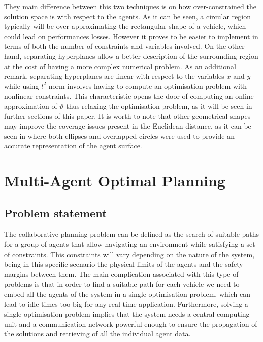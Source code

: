 \documentclass[a4paper,fleqn]{cas-sc}
\begin{document}
    They main difference between this two techniques is on how over-constrained the solution space is with respect to the agents. As it can be seen, a circular region typically will be over-approximating the rectangular shape of a vehicle, which could lead on performances losses. However it proves to be easier to implement in terms of both the number of constraints and variables involved. On the other hand, separating hyperplanes allow a better description of the surrounding region at the cost of having a more complex numerical problem. As an additional remark, separating hyperplanes are linear with respect to the variables $x$ and $y$ while using $l^2$ norm involves having to compute an optimisation problem with nonlinear constraints. This characteristic opens the door of computing an online approximation of $\vartheta$ thus relaxing the optimisation problem, as it will be seen in further sections of this paper. It is worth to note that other geometrical shapes may improve the coverage issues present in the Euclidean distance, as it can be seen in \cite{Frenet2022} where both ellipses and overlapped circles were used to provide an accurate representation of the agent surface. 
\section{Multi-Agent Optimal Planning}
\label{Sec:MA optimal plans}
\subsection{Problem statement}
The collaborative planning problem can be defined as the search of suitable paths for a group of agents that allow navigating an environment while satisfying a set of constraints. This constraints will vary depending on the nature of the system, being in this specific scenario the physical limits of the agents and the safety margins between them. The main complication associated with this type of problems is that in order to find a suitable path for each vehicle we need to embed all the agents of the system in a single optimisation problem, which can lead to idle times too big for any real time application. Furthermore, solving a single optimisation problem implies that the system needs a central computing unit and a communication network powerful enough to ensure the propagation of the solutions and retrieving of all the individual agent data.\\ 
\end{document}
